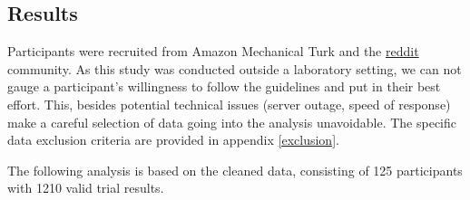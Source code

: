 \documentclass[12pt]{article}\usepackage[]{graphicx}\usepackage[]{color}
\newcommand{\newtext}[1]{\todo[inline, color=White]{ \color{OliveGreen}{#1}}} %
\begin{document}
\subsection{Results}
%
Participants were recruited from Amazon Mechanical Turk and the \href{http://reddit.com/r/SampleSize}{reddit} community. As this study was conducted outside a laboratory setting, we can not gauge a participant's willingness to follow the guidelines and put in their best effort. This, besides potential technical issues (server outage, speed of response) make a careful selection of data going into the analysis unavoidable. The specific data exclusion criteria are provided in appendix \ref{exclusion}. 

The following analysis is based on the cleaned data, consisting of 125 participants with 1210 valid trial results. 




\end{document}
